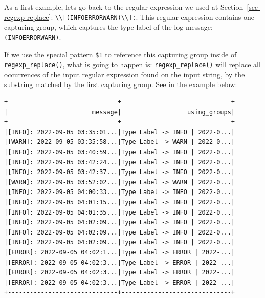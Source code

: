 \documentclass[
  11pt,
  letterpaper,
  DIV=11,
  numbers=noendperiod]{scrreprt}
\newenvironment{Shaded}{\begin{snugshade}}{\end{snugshade}}
\newcommand{\DecValTok}[1]{\textcolor[rgb]{0.68,0.00,0.00}{#1}}
\newcommand{\NormalTok}[1]{\textcolor[rgb]{0.00,0.23,0.31}{#1}}
\newcommand{\OperatorTok}[1]{\textcolor[rgb]{0.37,0.37,0.37}{#1}}
\newcommand{\StringTok}[1]{\textcolor[rgb]{0.13,0.47,0.30}{#1}}
\begin{document}
As a first example, lets go back to the regular expression we used at
Section~\ref{sec-regexp-replace}:
\texttt{\textbackslash{}\textbackslash{}{[}(INFO\textbar{}ERROR\textbar{}WARN)\textbackslash{}\textbackslash{}{]}:}.
This regular expression contains one capturing group, which captures the
type label of the log message:
\texttt{(INFO\textbar{}ERROR\textbar{}WARN)}.

If we use the special pattern \texttt{\$1} to reference this capturing
group inside of \texttt{regexp\_replace()}, what is going to happen is:
\texttt{regexp\_replace()} will replace all occurrences of the input
regular expression found on the input string, by the substring matched
by the first capturing group. See in the example below:

\begin{Shaded}
\end{Shaded}

\begin{verbatim}
+------------------------------+------------------------------+
|                       message|                  using_groups|
+------------------------------+------------------------------+
|[INFO]: 2022-09-05 03:35:01...|Type Label -> INFO | 2022-0...|
|[WARN]: 2022-09-05 03:35:58...|Type Label -> WARN | 2022-0...|
|[INFO]: 2022-09-05 03:40:59...|Type Label -> INFO | 2022-0...|
|[INFO]: 2022-09-05 03:42:24...|Type Label -> INFO | 2022-0...|
|[INFO]: 2022-09-05 03:42:37...|Type Label -> INFO | 2022-0...|
|[WARN]: 2022-09-05 03:52:02...|Type Label -> WARN | 2022-0...|
|[INFO]: 2022-09-05 04:00:33...|Type Label -> INFO | 2022-0...|
|[INFO]: 2022-09-05 04:01:15...|Type Label -> INFO | 2022-0...|
|[INFO]: 2022-09-05 04:01:35...|Type Label -> INFO | 2022-0...|
|[INFO]: 2022-09-05 04:02:09...|Type Label -> INFO | 2022-0...|
|[INFO]: 2022-09-05 04:02:09...|Type Label -> INFO | 2022-0...|
|[INFO]: 2022-09-05 04:02:09...|Type Label -> INFO | 2022-0...|
|[ERROR]: 2022-09-05 04:02:1...|Type Label -> ERROR | 2022-...|
|[ERROR]: 2022-09-05 04:02:3...|Type Label -> ERROR | 2022-...|
|[ERROR]: 2022-09-05 04:02:3...|Type Label -> ERROR | 2022-...|
|[ERROR]: 2022-09-05 04:02:3...|Type Label -> ERROR | 2022-...|
+------------------------------+------------------------------+
\end{verbatim}
\end{document}
